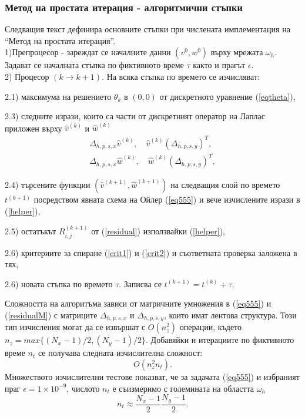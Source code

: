 \documentclass[a4paper]{article}
\newcommand{\be}{\begin{equation}}
\newcommand{\ee}{\end{equation}}
\newcommand{\rf}[1]{(\ref{#1})}
\theoremstyle{remark}
\begin{document}
\subsubsection{Метод на простата итерация - алгоритмични стъпки}
Следващия текст дефинира основните стъпки при числената имплементация на ``Метод на простата итерация''.
\\
1)Препроцесор - зареждат се началните данни $(v^0, w^0)$ върху мрежата $\omega_h$.  Задават се началната стъпка по фиктивното време $\tau$ както и прагът $\epsilon$.
\\
2) Процесор $(k \rightarrow k+1)$. На всяка стъпка по времето се изчисляват: 
\par
2.1) максимума на решението $\theta_k$ в $(0,0)$  от дискретното уравнение \rf{eqtheta},
\par
2.3) следните изрази, които са части от дискретният оператор на Лаплас приложен върху $\widehat{v}^{(k)}$ и $\widehat{w}^{(k)}$
\begin{align}\label{helper}
\Delta_{h,p,s,x}  \widehat{v}^{(k)}, \quad \widehat{v}^{(k)}  (\Delta_{h,p,s,y})^T, \nonumber\\
\Delta_{h,p,s,x}  \widehat{w}^{(k)},\quad  \widehat{w}^{(k)}  (\Delta_{h,p,s,y})^T,
\end{align}
\par
2.4) търсените функции $(\widehat{v}^{(k+1)}, \widehat{w}^{(k+1)})$  на следващия слой по времето $t^{(k+1)}$ посредством явната схема на Ойлер \rf{eq555} и вече изчислените изрази в \rf{helper},
\par
2.5) остатъкът $R^{(k+1)}_{i,j}$ от \rf{residual} използвайки \rf{helper},
\par
2.6) критериите за спиране  \rf{crit1} и \rf{crit2} и съответната проверка заложена в тях,
\par
2.6) новата стъпка по времето $\tau$. Записва се $t^{(k+1)}=t^{(k)}+\tau$.

Сложността на алгоритъма зависи от матричните умножения в \rf{eq555} и \rf{residualM} с матриците $\Delta_{h,p,s,x}$ и $\Delta_{h,p,s,y}$, които имат лентова структура. Този тип изчисления могат да се извършат с $O(n_z^2)$ операции, където $n_z = max\{(N_x-1)/2, (N_y-1)/2\}$.  Добавяйки и итерациите по фиктивното време $n_t$ се получава следната изчислителна сложност:
\be\label{complexElpt}
O(n_z^2 n_t).
\ee
Множеството изчислителни тестове показват, че за задачата \rf{eq555} и избраният праг $\epsilon = 1 \times 10^{-9}$, числото $n_t$ е съизмеримо с големината на областта $\omega_h$
\be
n_t \approx \frac{N_x-1}{2} \frac{N_y-1}{2}.
\ee
\end{document}
